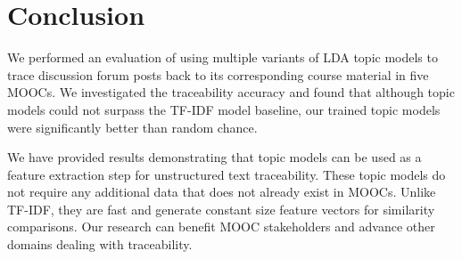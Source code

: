 \documentclass[sigconf, anonymous]{acmart}
\begin{document}
\section{Conclusion}
We performed an evaluation of using multiple variants of LDA topic models to trace discussion forum posts back to its corresponding course material in five MOOCs.
We investigated the traceability accuracy and found that although topic models could not surpass the TF-IDF model baseline, our trained topic models were significantly better than random chance.

We have provided results demonstrating that topic models can be used as a feature extraction step for unstructured text traceability.
These topic models do not require any additional data that does not already exist in MOOCs.
Unlike TF-IDF, they are fast and generate constant size feature vectors for similarity comparisons.
Our research can benefit MOOC stakeholders and advance other domains dealing with traceability.



\end{document}
